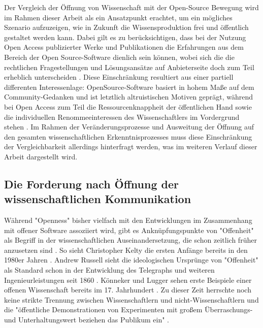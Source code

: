 Der Vergleich der Öffnung von Wissenschaft mit der Open-Source Bewegung wird im Rahmen dieser Arbeit als ein Ansatzpunkt erachtet, um ein mögliches Szenario aufzuzeigen, wie in Zukunft die Wissensproduktion frei und öffentlich gestaltet werden kann. Dabei gilt es zu berücksichtigen, dass bei der Nutzung Open Access publizierter Werke und Publikationen die Erfahrungen aus dem Bereich der Open Source-Software dienlich sein können, wobei sich die die rechtlichen Fragestellungen und Lösungsansätze auf Anbieterseite doch zum Teil erheblich unterscheiden \cite{dorschel_2006_open}. Diese Einschränkung resultiert aus einer partiell differenten Interessenlage: OpenSource-Software basiert in hohem Maße auf dem Community-Gedanken und ist letztlich altruistischen Motiven geprägt, während bei Open Access zum Teil die Ressourcenknappheit der öffentlichen Hand sowie die individuellen Renommeeinteressen des Wissenschaftlers im Vordergrund stehen \cite{dorschel_2006_open}. Im Rahmen der Veränderungsprozesse und Ausweitung der Öffnung auf den gesamten wissenschaftlichen Erkenntnisprozesses muss diese Einschränkung der Vergleichbarkeit allerdings hinterfragt werden, was im weiteren Verlauf dieser Arbeit dargestellt wird.

\subsection{Die Forderung nach Öffnung der wissenschaftlichen Kommunikation}

Während "Openness" bisher vielfach mit den Entwicklungen im Zusammenhang mit offener Software assoziiert wird, gibt es Anknüpfungspunkte von "Offenheit" als Begriff in der wissenschaftlichen Auseinandersetzung, die schon zeitlich früher anzusetzen sind \cite{Tkacz_2014}. So sieht Christopher Kel­ty die ersten Anfänge bereits in den 1980er Jahren \cite{kelty_2008_two_bits}. Andrew Russell sieht die ideologischen Ursprünge von "Offenheit" als Standard schon in der Entwicklung des Telegraphs und weiteren Ingenieurleistungen seit 1860 \cite{Russell_2014}. Könneker und Lugger sehen erste Beispiele einer offenen Wissenschaft bereits im 17. Jahrhundert \cite{Konneker_2013}. Zu dieser Zeit herrschte noch keine strikte Trennung zwischen Wissenschaftlern und nicht-Wissenschaftlern und die "öffentliche Demonstrationen von Experimenten mit großem Überraschungs-und Unterhaltungswert beziehen das Publikum ein" \cite{weingart_2005_wissenschaft}.

